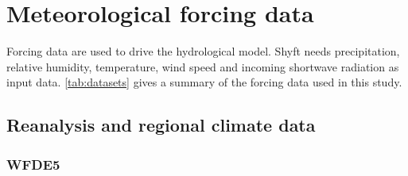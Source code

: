 \label{sec:methods}

\section{Meteorological forcing data}


Forcing data are used to drive the hydrological model. Shyft needs precipitation, relative humidity, temperature, wind speed and incoming shortwave radiation as input data. \autoref{tab:datasets} gives a summary of the forcing data used in this study.


\begin{table}[ht]
    \centering
    \caption{Summary of the forcing datasets}
    \label{tab:datasets}
\end{table}




\subsection{Reanalysis and regional climate data}

\subsubsection{WFDE5}

